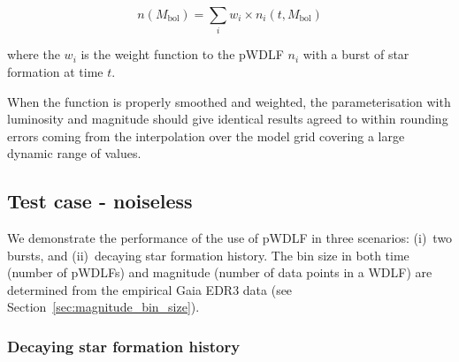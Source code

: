 \documentclass[fleqn,usenatbib]{mnras}
\begin{document}
\begin{equation}
    n(M_\mathrm{bol}) = \sum_i w_i \times n_i(t, M_\mathrm{bol})    
\end{equation}

where the $w_i$ is the weight function to the pWDLF $n_i$ with a
burst of star formation at time $t$.

When the function is properly smoothed and weighted, the
parameterisation with luminosity and magnitude should give identical
results agreed to within rounding errors coming from the interpolation
over the model grid covering a large dynamic range of values.

\subsection{Test case - noiseless}

We demonstrate the performance of the use of pWDLF in three scenarios:
(i)~two bursts, and (ii)~decaying star formation history. The bin size
in both time (number of pWDLFs) and magnitude (number of data points in
a WDLF) are determined from the empirical Gaia EDR3 data (see
Section~\ref{sec:magnitude_bin_size}).

\subsubsection*{Decaying star formation history}
\end{document}
